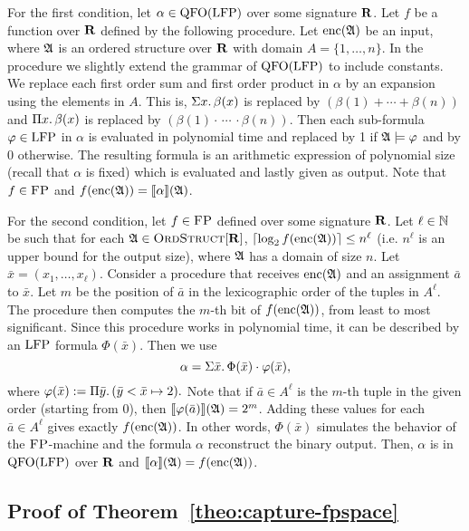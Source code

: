 For the first condition, let $\alpha\in{\rm QFO}({\rm LFP})$ over some signature $\mathbf{R}$. Let $f$ be a function over $\mathbf{R}$ defined by the following procedure. Let ${\rm enc}(\mathfrak{A})$ be an input, where $\mathfrak{A}$ is an ordered structure over $\mathbf{R}$ with domain $A = \{1,\ldots,n\}$. In the procedure we slightly extend the grammar of ${\rm QFO}({\rm LFP})$ to include constants. We replace each first order sum and first order product in $\alpha$ by an expansion using the elements in $A$. This is, $\Sigma{x}.\, \beta(x)$ is replaced by $(\beta(1)+\cdots+\beta(n))$ and $\Pi{x}.\,\beta(x)$ is replaced by $(\beta(1)\cdot\,\cdots\,\cdot\beta(n))$. Then each sub-formula $\varphi\in{\rm LFP}$ in $\alpha$ is evaluated in polynomial time and replaced by 1 if $\mathfrak{A}\models\varphi$ and by 0 otherwise. The resulting formula is an arithmetic expression of polynomial size (recall that $\alpha$ is fixed) which is evaluated and lastly given as output. Note that $f\in\text{\sc FP}$ and $f({\rm enc}(\mathfrak{A})) = {\llbracket{}{\alpha}\rrbracket}(\mathfrak{A})$.
	
For the second condition, let $f\in \text{\sc FP}$ defined over some signature $\mathbf{R}$.
Let $\ell\in\mathbb{N}$ be such that for each $\mathfrak{A}\in\text{\sc OrdStruct}[\mathbf{R}]$, $\lceil\log_2 f({\rm enc}(\mathfrak{A})) \rceil \leq n^\ell$ (i.e. $n^\ell$ is an upper bound for the output size), where $\mathfrak{A}$ has a domain of size $n$.
Let $\bar{x} = (x_1,\ldots,x_{\ell})$.
Consider a procedure that receives ${\rm enc}(\mathfrak{A})$ and an assignment $\bar{a}$ to $\bar{x}$. Let $m$ be the position of $\bar{a}$ in the lexicographic order of the tuples in $A^{\ell}$. The procedure then computes the $m$-th bit of $f({\rm enc}(\mathfrak{A}))$, from least to most significant. Since this procedure works in polynomial time, it can be described by an ${\rm LFP}$ formula $\Phi(\bar{x})$. Then we use
$$
\alpha = \Sigma{\bar{x}}.\, \Phi(\bar{x})\cdot\varphi(\bar{x}),
$$
where $\varphi(\bar{x}) := \Pi{\bar{y}}.\,(\bar{y} < \bar{x} \mapsto 2).$ Note that if $\bar{a} \in A^{\ell}$ is the $m$-th tuple in the given order (starting from 0), then ${\llbracket{}{\varphi(\bar{a})}\rrbracket}(\mathfrak{A}) = 2^{m}$. Adding these values for each $\bar{a}\in A^{\ell}$ gives exactly $f({\rm enc}(\mathfrak{A}))$. 
In other words, $\Phi(\bar{x})$ simulates the behavior of the $\text{\sc FP}$-machine and the formula $\alpha$ reconstruct the binary output.
Then, $\alpha$ is in ${\rm QFO}({\rm LFP})$ over $\mathbf{R}$ and ${\llbracket{}{\alpha}\rrbracket}(\mathfrak{A}) = f({\rm enc}(\mathfrak{A}))$.

\medskip

\subsection*{Proof of Theorem~\ref{theo:capture-fpspace}}

